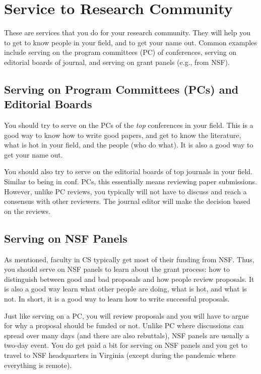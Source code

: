 \documentclass[oneside,11pt,dvipsnames]{book}
\begin{document}
\section{Service to Research Community}

These are services that you do for your research community. They will help you to get to know people in your field, and to get your name out.  Common examples include serving on the program committees (PC) of conferences, serving on editorial boards of journal, and serving on grant panels (e.g., from NSF).

\subsection{Serving on Program Committees (PCs) and Editorial Boards} You should try to serve on the PCs  of the \emph{top} conferences in your field. This is a good way to know how to write good papers, and get to know the literature, what is hot in your field, and the people (who do what). It is also a good way to get your name out.  


You should also try to serve on the editorial boards of top journals in your field.
Similar to being in conf. PCs, this essentially means reviewing paper submissions. However, unlike PC reviews, you typically will not have to discuss and reach a consensus with other reviewers. The journal editor will make the decision based on the reviews. 

\subsection{Serving on NSF Panels} As mentioned, faculty in CS typically get most of their funding from NSF. Thus, you should serve on NSF panels to learn about the grant process: how to distinguish between good and bad proposals and how people review proposals.
It is also a good way learn what other people are doing, what is hot, and what is not. In short, it is a good way to learn how to write successful proposals.

Just like serving on a PC, you will review proposals and you will have to argue for why a proposal should be funded or not.  Unlike PC where discussions can spread over many days (and there are also rebuttals), NSF panels are usually a two-day event.  You do get paid a bit for serving on NSF panels and you get to travel to NSF headquarters in Virginia (except during the pandemic where everything is remote).
\end{document}
